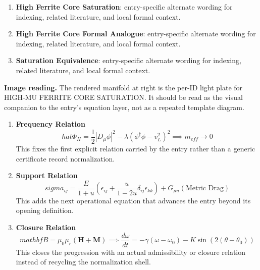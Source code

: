 \begin{enumerate}[leftmargin=1.6em,itemsep=6pt,topsep=4pt]
\item \textbf{High Ferrite Core Saturation}: entry-specific alternate wording for indexing, related literature, and local formal context.
\item \textbf{High Ferrite Core Formal Analogue}: entry-specific alternate wording for indexing, related literature, and local formal context.
\item \textbf{Saturation Equivalence}: entry-specific alternate wording for indexing, related literature, and local formal context.
\end{enumerate}

\begin{samepage}
\noindent\begin{minipage}[t]{0.45\linewidth}
\vspace{0pt}
\raggedright
\scriptsize\textbf{Image reading.} The rendered manifold at right is the per-ID light plate for HIGH-MU FERRITE CORE SATURATION. It should be read as the visual companion to the entry's equation layer, not as a repeated template diagram.\par
\end{minipage}\hfill
\begin{minipage}[t]{0.53\linewidth}
\vspace*{-0.10in}
\raggedright
{}
\end{minipage}
\end{samepage}

\clearpage


\begin{enumerate}[leftmargin=1.6em,itemsep=9pt,topsep=6pt]
\item \textbf{Frequency Relation}
\[
hat{\Phi}_H = \frac{1}{2}|D_\mu \phi|^2 - \lambda(\phi^\dagger \phi - v_L^2)^2 \implies m_{eff} \to 0
\]
This fixes the first explicit relation carried by the entry rather than a generic certificate record normalization.

\item \textbf{Support Relation}
\[
sigma_{ij} = \frac{E}{1+ u} \left( \epsilon_{ij} + \frac{ u}{1-2 u} \delta_{ij}\epsilon_{kk} \right) + G_{\mu u}(\text{Metric Drag})
\]
This adds the next operational equation that advances the entry beyond its opening definition.

\item \textbf{Closure Relation}
\[
mathbf{B} = \mu_0\mu_r(\mathbf{H}+\mathbf{M}) \implies \frac{d\omega}{dt} = -\gamma(\omega - \omega_0) - K \sin(2(\theta - \theta_0))
\]
This closes the progression with an actual admissibility or closure relation instead of recycling the normalization shell.
\end{enumerate}

